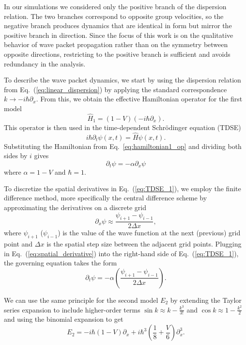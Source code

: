 \documentclass[%
 aip,
 amsmath,amssymb,
 reprint,%
]{revtex4-1}
\begin{document}
In our simulations we considered only the positive branch of the dispersion relation. The two branches correspond to opposite group velocities, so the negative branch produces dynamics that are identical in form but mirror the positive branch in direction. Since the focus of this work is on the qualitative behavior of wave packet propagation rather than on the symmetry between opposite directions, restricting to the positive branch is sufficient and avoids redundancy in the analysis.

To describe the wave packet dynamics, we start by using the dispersion relation from Eq.\ (\ref{eq:linear_dispersion}) by applying the standard correspondence $k \rightarrow -i \hbar \partial_x$. From this, we obtain the effective Hamiltonian operator for the first model
\begin{equation}
\label{eq:hamiltonian1_op}
\hat{H}_1 = (1 - V)(-i\hbar\partial_x).
\end{equation}
This operator is then used in the time-dependent Schrödinger equation (TDSE)
\begin{equation}
i\hbar \partial_t \psi (x,t) =\hat{H} \psi(x,t).
\end{equation}
Substituting the Hamiltonian from Eq.~\eqref{eq:hamiltonian1_op} and dividing both sides by $i$ gives
\begin{equation}
\label{eq:TDSE_1}
\partial_t \psi = -\alpha \partial_x \psi
\end{equation}
where $\alpha = 1-V$ and $\hbar =1$.

To discretize the spatial derivatives in Eq.~(\ref{eq:TDSE_1}), we employ the finite difference method, more specifically the central difference scheme by approximating the derivatives on a discrete grid
\begin{equation}
\label{eq:spatial_derivative}
\partial_x \psi \approx \frac{\psi_{i+1} - \psi_{i-1}} {2 \Delta x},
\end{equation}
where $\psi_{i+1}$ ($\psi_{i-1}$) is the value of the wave function at the next (previous) grid point and $\Delta x$ is the spatial step size between the adjacent grid points. Plugging in Eq.\ (\ref{eq:spatial_derivative}) into the right-hand side of Eq.\ (\ref{eq:TDSE_1}), the governing equation takes the form
\begin{equation}
\partial_t \psi =  -\alpha \left( \frac{\psi_{i+1} - \psi_{i-1}}{2 \Delta x} \right).
\end{equation}

We can use the same principle for the second model $E_2$ by extending the Taylor series expansion to include higher-order terms $\sin k \approx k - \frac{k^3}{3!}$ and $\cos k \approx 1 - \frac{k^2}{2}$ and using the binomial expansion to get
\begin{equation}
\label{eq:dispersion2_real_space}
E_2  = -i \hbar (1-V) \partial_x + i \hbar^3 \left(\frac{1}{8} + \frac{V}{6}\right)\partial^3_x.
\end{equation}
\end{document}
